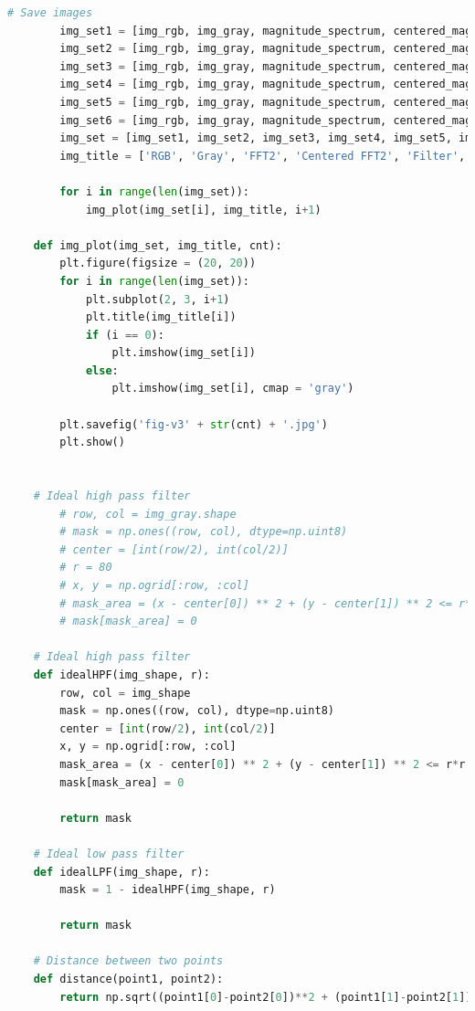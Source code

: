 \documentclass{article}
\begin{document}
{\begin{lstlisting}[language=Python, caption=Code for applying filters in frequency domain]
        # Save images
        img_set1 = [img_rgb, img_gray, magnitude_spectrum, centered_magnitude_spectrum, mask1, img_filtered1_ishift_ifft]
        img_set2 = [img_rgb, img_gray, magnitude_spectrum, centered_magnitude_spectrum, mask2, img_filtered2_ishift_ifft]
        img_set3 = [img_rgb, img_gray, magnitude_spectrum, centered_magnitude_spectrum, mask3, img_filtered3_ishift_ifft]
        img_set4 = [img_rgb, img_gray, magnitude_spectrum, centered_magnitude_spectrum, mask4, img_filtered4_ishift_ifft]
        img_set5 = [img_rgb, img_gray, magnitude_spectrum, centered_magnitude_spectrum, mask5, img_filtered5_ishift_ifft]
        img_set6 = [img_rgb, img_gray, magnitude_spectrum, centered_magnitude_spectrum, mask6, img_filtered6_ishift_ifft]
        img_set = [img_set1, img_set2, img_set3, img_set4, img_set5, img_set6]
        img_title = ['RGB', 'Gray', 'FFT2', 'Centered FFT2', 'Filter', 'Filtered Imgae']
    
        for i in range(len(img_set)):
            img_plot(img_set[i], img_title, i+1)
    
    def img_plot(img_set, img_title, cnt):
        plt.figure(figsize = (20, 20))
        for i in range(len(img_set)):
            plt.subplot(2, 3, i+1)
            plt.title(img_title[i])
            if (i == 0):
                plt.imshow(img_set[i])
            else:
                plt.imshow(img_set[i], cmap = 'gray')
        
        plt.savefig('fig-v3' + str(cnt) + '.jpg')
        plt.show()
    
    
    # Ideal high pass filter
        # row, col = img_gray.shape
        # mask = np.ones((row, col), dtype=np.uint8)
        # center = [int(row/2), int(col/2)]
        # r = 80
        # x, y = np.ogrid[:row, :col]
        # mask_area = (x - center[0]) ** 2 + (y - center[1]) ** 2 <= r*r
        # mask[mask_area] = 0
    
    # Ideal high pass filter
    def idealHPF(img_shape, r):
        row, col = img_shape
        mask = np.ones((row, col), dtype=np.uint8)
        center = [int(row/2), int(col/2)]
        x, y = np.ogrid[:row, :col]
        mask_area = (x - center[0]) ** 2 + (y - center[1]) ** 2 <= r*r
        mask[mask_area] = 0
    
        return mask
    
    # Ideal low pass filter
    def idealLPF(img_shape, r):
        mask = 1 - idealHPF(img_shape, r)
    
        return mask
    
    # Distance between two points
    def distance(point1, point2):
        return np.sqrt((point1[0]-point2[0])**2 + (point1[1]-point2[1])**2)
    

\end{lstlisting}}
\end{document}
